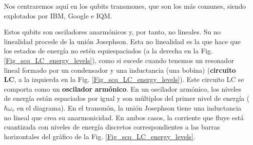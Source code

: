 Nos centraremos aquí en los qubits transmones, que son los más comunes, siendo explotados por IBM, Google e IQM. 

Estos qubits son osciladores anarmónicos y, por tanto, no lineales. Su no linealidad procede de la unión Josephson. Esta no linealidad es la que hace que los estados de energía no estén equiespaciados (a la derecha en la Fig. \ref{Fig_scq_LC_energy_levels}), como si sucede cuando tenemos un resonador lineal formado por un condensador y una inductancia (una bobina) (\textbf{circuito LC}, a la izquierda en la Fig. \ref{Fig_scq_LC_energy_levels}). Este circuito LC se comporta como un \textbf{oscilador armónico}. En un oscilador armónico, los niveles de energía están espaciados por igual y son múltiplos del primer nivel de energía ($\hbar \omega_r$ en el diagrama). En el transmón, la unión Josephson tiene una inductancia no lineal que crea su anarmonicidad. En ambos casos, la corriente que fluye está cuantizada con niveles de energía discretos correspondientes a las barras horizontales del gráfico de la Fig. \ref{Fig_scq_LC_energy_levels}.


